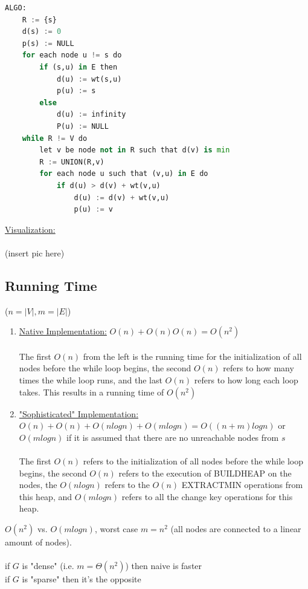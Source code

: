 \documentclass[12pt]{article}
\begin{document}
\begin{lstlisting}[language=Python]
ALGO:
	R := {s}
	d(s) := 0
	p(s) := NULL
	for each node u != s do
		if (s,u) in E then
			d(u) := wt(s,u)
			p(u) := s
		else
			d(u) := infinity
			P(u) := NULL
	while R != V do
		let v be node not in R such that d(v) is min
		R := UNION(R,v)
		for each node u such that (v,u) in E do
			if d(u) > d(v) + wt(v,u)
				d(u) := d(v) + wt(v,u)
				p(u) := v
\end{lstlisting}

\underline{Visualization:}\\
\\
(insert pic here)

\subsection{Running Time}

($n = |V|, m = |E|$)

\begin{enumerate}
	\item{ \underline{Native Implementation:} $O(n) + O(n)O(n) = O(n^2)$\\
	\\
	The first $O(n)$ from the left is the running time for the initialization of all nodes before the while loop begins, the second $O(n)$ refers to how many times the while loop runs, and the last $O(n)$ refers to how long each loop takes. This results in a running time of $O(n^2)$}
	\item{ \underline{"Sophisticated" Implementation:}\\ $O(n) + O(n) + O(nlogn) + O(mlogn) = O((n+m)logn)$ or $O(mlogn)$ if it is assumed that there are no unreachable nodes from $s$}\\
	\\
	The first $O(n)$ refers to the initialization of all nodes before the while loop begins, the second $O(n)$ refers to the execution of BUILDHEAP on the nodes, the $O(nlogn)$ refers to the $O(n)$ EXTRACTMIN operations from this heap, and $O(mlogn)$ refers to all the change key operations for this heap.
\end{enumerate}

$O(n^2)$ vs. $O(mlogn)$, worst case $m = n^2$ (all nodes are connected to a linear amount of nodes).\\
\\
if $G$ is "dense" (i.e. $m = \Theta (n^2)$) then naive is faster\\
if $G$ is "sparse" then it's the opposite
\end{document}
